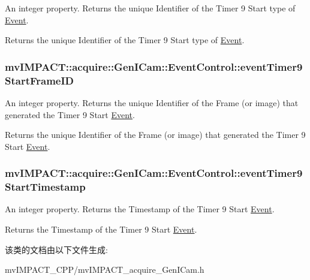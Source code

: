 An integer property. Returns the unique Identifier of the Timer 9 Start type of \hyperlink{classmv_i_m_p_a_c_t_1_1acquire_1_1_event}{Event}. 

Returns the unique Identifier of the Timer 9 Start type of \hyperlink{classmv_i_m_p_a_c_t_1_1acquire_1_1_event}{Event}. \hypertarget{classmv_i_m_p_a_c_t_1_1acquire_1_1_gen_i_cam_1_1_event_control_a19031e57766532bad6658c8d1346c945}{
\subsubsection[{event\+Timer9\+Start\+Frame\+I\+D}]{ mv\+I\+M\+P\+A\+C\+T\+::acquire\+::\+Gen\+I\+Cam\+::\+Event\+Control\+::event\+Timer9\+Start\+Frame\+I\+D}}\label{classmv_i_m_p_a_c_t_1_1acquire_1_1_gen_i_cam_1_1_event_control_a19031e57766532bad6658c8d1346c945}


An integer property. Returns the unique Identifier of the Frame (or image) that generated the Timer 9 Start \hyperlink{classmv_i_m_p_a_c_t_1_1acquire_1_1_event}{Event}. 

Returns the unique Identifier of the Frame (or image) that generated the Timer 9 Start \hyperlink{classmv_i_m_p_a_c_t_1_1acquire_1_1_event}{Event}. \hypertarget{classmv_i_m_p_a_c_t_1_1acquire_1_1_gen_i_cam_1_1_event_control_ae30f108ae7a05ae9904f44d927e59f64}{
\subsubsection[{event\+Timer9\+Start\+Timestamp}]{ mv\+I\+M\+P\+A\+C\+T\+::acquire\+::\+Gen\+I\+Cam\+::\+Event\+Control\+::event\+Timer9\+Start\+Timestamp}}\label{classmv_i_m_p_a_c_t_1_1acquire_1_1_gen_i_cam_1_1_event_control_ae30f108ae7a05ae9904f44d927e59f64}


An integer property. Returns the Timestamp of the Timer 9 Start \hyperlink{classmv_i_m_p_a_c_t_1_1acquire_1_1_event}{Event}. 

Returns the Timestamp of the Timer 9 Start \hyperlink{classmv_i_m_p_a_c_t_1_1acquire_1_1_event}{Event}. 

该类的文档由以下文件生成\+:\begin{DoxyCompactItemize}
\item 
mv\+I\+M\+P\+A\+C\+T\+\_\+\+C\+P\+P/mv\+I\+M\+P\+A\+C\+T\+\_\+acquire\+\_\+\+Gen\+I\+Cam.\+h\end{DoxyCompactItemize}
